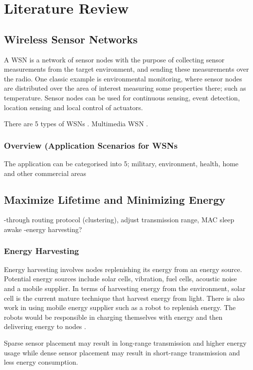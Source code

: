 \chapter{Literature Review}
\label{literatureReview}

\section{Wireless Sensor Networks}
A WSN is a network of sensor nodes with the purpose of collecting sensor measurements from the target environment, and sending these measurements over the radio. One classic example is environmental monitoring, where sensor nodes are distributed over the area of interest measuring some properties there; such as temperature.
Sensor nodes can be used for continuous sensing, event detection, location sensing and local control of actuators. 

There are 5 types of WSNs \cite{wsnSurvey1}.
Multimedia WSN \cite{wsnSurvey3}.

\subsection{Overview (Application Scenarios for WSNs}
The application can be categorised into 5; military, environment, health, home and other commercial areas \cite{wsnSurvey2}

\section{Maximize Lifetime and Minimizing Energy}
-through routing protocol (clustering), adjust transmission range, MAC sleep awake 
-energy harvesting?

\subsection{Energy Harvesting}
Energy harvesting involves nodes replenishing its energy from an energy source. Potential energy sources include solar cells, vibration, fuel cells, acoustic noise and a mobile supplier. In terms of harvesting energy from the environment, solar cell is the current mature technique that harvest energy from light. There is also work in using mobile energy supplier such as a robot to replenish energy. The robots would be responsible in charging themselves with energy and then delivering energy to nodes \cite{wsnSurvey1}.

Sparse sensor placement may result in long-range transmission and higher energy usage while dense sensor placement may result in short-range transmission and less energy consumption.

